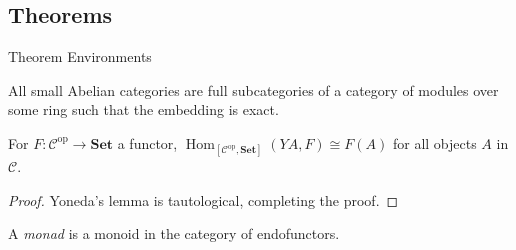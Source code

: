 \documentclass{beamer}
\begin{document}
\subsection{Theorems}

\begin{frame}{Theorem Environments}
    \begin{theorem}
        All small Abelian categories are full subcategories of a category of modules over some ring such that the embedding is exact.
    \end{theorem}
    \begin{lemma}[Yoneda]
        For \(F\colon \mathcal{C}^\mathrm{op}\to \mathbf{Set}\) a functor, \(\operatorname{Hom}_{[\mathcal{C}^\mathrm{op},\mathbf{Set}]}(YA, F) \cong F(A)\) for all objects \(A\) in \(\mathcal{C}\).
    \end{lemma}
    \begin{proof}
        Yoneda's lemma is tautological, completing the proof.
    \end{proof}
    \begin{definition}
        A \emph{monad} is a monoid in the category of endofunctors.
    \end{definition}
\end{frame}

\questionframe[cap=blue]
\end{document}
